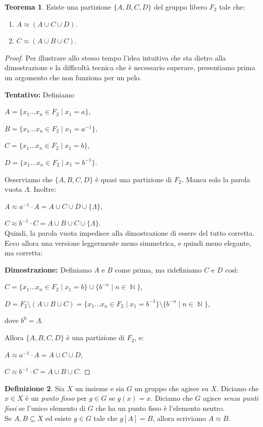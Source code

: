 \documentclass[12pt,a4paper]{report}
\theoremstyle{definition}
\newtheorem{teo}{Teorema}[section]  %
\newtheorem{defn}[teo]{Definizione}  %
\theoremstyle{num.custom-title}
\DeclareMathOperator{\N}{\mathbb{N}}
\DeclareMathOperator{\sm}{\setminus}
\begin{document}
\begin{teo}
Esiste una partizione $\{A,B,C,D\}$ del gruppo libero $F_2$ tale che:
\begin{enumerate}
\item $A \approx (A \cup C \cup D)$.
\item $C \approx (A \cup B \cup C)$.
\end{enumerate}
\begin{proof}
Per illustrare allo stesso tempo l'idea intuitiva che sta dietro alla dimostrazione e la difficoltà tecnica che è necessario superare, presentiamo prima un argomento che non funziona per un pelo.

\textbf{Tentativo:} Definiamo

$A=\{x_1...x_n \in F_2 \mid x_1=a\}$,

$B=\{x_1...x_n \in F_2 \mid x_1=a^{-1}\}$,

$C=\{x_1...x_n \in F_2 \mid x_1=b\}$,

$D=\{x_1...x_n \in F_2 \mid x_1=b^{-1}\}$.

Osserviamo che $\{A,B,C,D\}$ è quasi una partizione di $F_2$. Manca solo la parola vuota $\Lambda$. Inoltre:

$A \approx a^{-1} \cdot A = A \cup C \cup D \cup \{\Lambda\}$,

$C \approx b^{-1} \cdot C = A \cup B \cup C \cup \{\Lambda\}$.\\

Quindi, la parola vuota impedisce alla dimostrazione di essere del tutto corretta. Ecco allora una versione leggermente meno simmetrica, e quindi meno elegante, ma corretta:

\textbf{Dimostrazione:} Definiamo $A$ e $B$ come prima, ma ridefiniamo $C$ e $D$ così:

$C=\{x_1...x_n \in F_2 \mid x_1=b\} \cup \{b^{-n} \mid n \in \N\}$,

$D=F_2 \sm (A \cup B \cup C) = \{x_1...x_n \in F_2 \mid x_1=b^{-1}\} \sm \{b^{-n} \mid n \in \N\}$,

dove $b^0=\Lambda$.

Allora $\{A,	B,C,D\}$ è una partizione di $F_2$, e:

$A \approx a^{-1} \cdot A = A \cup C \cup D$,

$C \approx b^{-1} \cdot C = A \cup B \cup C$.
\end{proof}
\end{teo}


\begin{defn}
Sia $X$ un insieme e sia $G$ un gruppo che agisce su $X$. Diciamo che $x \in X$ è un \emph{punto fisso} per $g \in G$ se $g(x)=x$. Diciamo che $G$ agisce \emph{senza punti fissi} se l'unico elemento di $G$ che ha un punto fisso è l'elemento neutro.\\
Se $A,B \subseteq X$ ed esiste $g \in G$ tale che $g[A]=B$, allora scriviamo $A \approx B$.
\end{defn}
\end{document}
